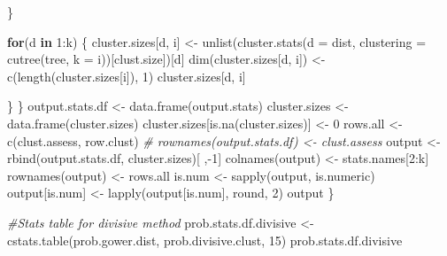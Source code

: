 \documentclass[
]{article}
\newenvironment{Shaded}{\begin{snugshade}}{\end{snugshade}}
\newcommand{\AttributeTok}[1]{\textcolor[rgb]{0.77,0.63,0.00}{#1}}
\newcommand{\CommentTok}[1]{\textcolor[rgb]{0.56,0.35,0.01}{\textit{#1}}}
\newcommand{\ControlFlowTok}[1]{\textcolor[rgb]{0.13,0.29,0.53}{\textbf{#1}}}
\newcommand{\DecValTok}[1]{\textcolor[rgb]{0.00,0.00,0.81}{#1}}
\newcommand{\FunctionTok}[1]{\textcolor[rgb]{0.00,0.00,0.00}{#1}}
\newcommand{\NormalTok}[1]{#1}
\newcommand{\OtherTok}[1]{\textcolor[rgb]{0.56,0.35,0.01}{#1}}
\newcommand{\SpecialCharTok}[1]{\textcolor[rgb]{0.00,0.00,0.00}{#1}}
\begin{document}
\begin{Shaded}
\begin{Highlighting}[]
\NormalTok{    \}}
    
    \ControlFlowTok{for}\NormalTok{(d }\ControlFlowTok{in} \DecValTok{1}\SpecialCharTok{:}\NormalTok{k) \{}
\NormalTok{      cluster.sizes[d, i] }\OtherTok{\textless{}{-}} \FunctionTok{unlist}\NormalTok{(}\FunctionTok{cluster.stats}\NormalTok{(}\AttributeTok{d =}\NormalTok{ dist, }\AttributeTok{clustering =} \FunctionTok{cutree}\NormalTok{(tree, }\AttributeTok{k =}\NormalTok{ i))[clust.size])[d]}
      \FunctionTok{dim}\NormalTok{(cluster.sizes[d, i]) }\OtherTok{\textless{}{-}} \FunctionTok{c}\NormalTok{(}\FunctionTok{length}\NormalTok{(cluster.sizes[i]), }\DecValTok{1}\NormalTok{)}
\NormalTok{      cluster.sizes[d, i]}
      
\NormalTok{    \}}
\NormalTok{  \}}
\NormalTok{  output.stats.df }\OtherTok{\textless{}{-}} \FunctionTok{data.frame}\NormalTok{(output.stats)}
\NormalTok{  cluster.sizes }\OtherTok{\textless{}{-}} \FunctionTok{data.frame}\NormalTok{(cluster.sizes)}
\NormalTok{  cluster.sizes[}\FunctionTok{is.na}\NormalTok{(cluster.sizes)] }\OtherTok{\textless{}{-}} \DecValTok{0}
\NormalTok{  rows.all }\OtherTok{\textless{}{-}} \FunctionTok{c}\NormalTok{(clust.assess, row.clust)}
  \CommentTok{\# rownames(output.stats.df) \textless{}{-} clust.assess}
\NormalTok{  output }\OtherTok{\textless{}{-}} \FunctionTok{rbind}\NormalTok{(output.stats.df, cluster.sizes)[ ,}\SpecialCharTok{{-}}\DecValTok{1}\NormalTok{]}
  \FunctionTok{colnames}\NormalTok{(output) }\OtherTok{\textless{}{-}}\NormalTok{ stats.names[}\DecValTok{2}\SpecialCharTok{:}\NormalTok{k]}
  \FunctionTok{rownames}\NormalTok{(output) }\OtherTok{\textless{}{-}}\NormalTok{ rows.all}
\NormalTok{  is.num }\OtherTok{\textless{}{-}} \FunctionTok{sapply}\NormalTok{(output, is.numeric)}
\NormalTok{  output[is.num] }\OtherTok{\textless{}{-}} \FunctionTok{lapply}\NormalTok{(output[is.num], round, }\DecValTok{2}\NormalTok{)}
\NormalTok{  output}
\NormalTok{\}}
\end{Highlighting}
\end{Shaded}

\begin{Shaded}
\begin{Highlighting}[]
\CommentTok{\#Stats table for divisive method}
\NormalTok{prob.stats.df.divisive }\OtherTok{\textless{}{-}} \FunctionTok{cstats.table}\NormalTok{(prob.gower.dist, prob.divisive.clust, }\DecValTok{15}\NormalTok{)}
\NormalTok{prob.stats.df.divisive}
\end{Highlighting}
\end{Shaded}
\end{document}
